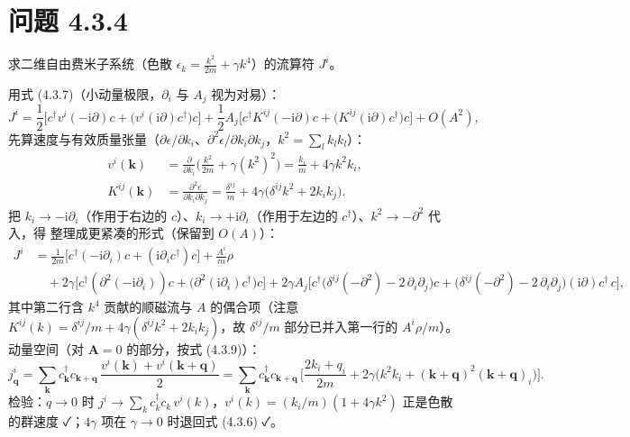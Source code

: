 \section*{问题 4.3.4}
\begin{problem}
求二维自由费米子系统（色散 $\epsilon_k=\frac{k^2}{2m}+\gamma k^4$）的流算符 $J^i$。
\end{problem}
\solution
用式 (4.3.7)（小动量极限，$\partial_i$ 与 $A_j$ 视为对易）：
\begin{equation*}
J^i=\frac{1}{2}\Big[c^\dagger v^i(-\mathrm{i}\partial)c+\big(v^i(\mathrm{i}\partial)c^\dagger\big)c\Big]
+\frac{1}{2}A_j\Big[c^\dagger K^{ij}(-\mathrm{i}\partial)c+\big(K^{ij}(\mathrm{i}\partial)c^\dagger\big)c\Big]+O(A^2),
\end{equation*}
先算速度与有效质量张量（$\partial\epsilon/\partial k_i$、$\partial^2\epsilon/\partial k_i\partial k_j$，$k^2=\sum_lk_lk_l$）：
\begin{align*}
v^i(\pmb k)&=\frac{\partial}{\partial k_i}\Big(\frac{k^2}{2m}+\gamma(k^2)^2\Big)=\frac{k_i}{m}+4\gamma k^2k_i,\\
K^{ij}(\pmb k)&=\frac{\partial^2\epsilon}{\partial k_i\partial k_j}
=\frac{\delta^{ij}}{m}+4\gamma\big(\delta^{ij}k^2+2k_ik_j\big).
\end{align*}
把 $k_i\to-\mathrm{i}\partial_i$（作用于右边的 $c$）、$k_i\to+\mathrm{i}\partial_i$（作用于左边的 $c^\dagger$）、$k^2\to-\partial^2$ 代入，得
整理成更紧凑的形式（保留到 $O(A)$）：
\begin{align*}
J^i&=\frac{1}{2m}\Big[c^\dagger(-\mathrm{i}\partial_i)c+(\mathrm{i}\partial_ic^\dagger)c\Big]+\frac{A^i}{m}\rho\\
&\quad+2\gamma\Big[c^\dagger(\partial^2(-\mathrm{i}\partial_i))c+\big(\partial^2(\mathrm{i}\partial_i)c^\dagger\big)c\Big]
+2\gamma A_j\Big[c^\dagger\big(\delta^{ij}(-\partial^2)-2\,\partial_i\partial_j\big)c+\big(\delta^{ij}(-\partial^2)-2\,\partial_i\partial_j\big)(\mathrm{i}\partial)c^\dagger\,c\Big],
\end{align*}
其中第二行含 $k^4$ 贡献的顺磁流与 $A$ 的偶合项（注意 $K^{ij}(k)=\delta^{ij}/m+4\gamma(\delta^{ij}k^2+2k_ik_j)$，故 $\delta^{ij}/m$ 部分已并入第一行的 $A^i\rho/m$）。动量空间（对 $\pmb A=0$ 的部分，按式 (4.3.9)）：
\begin{equation*}
j^i_{\pmb q}=\sum_{\pmb k}c^\dagger_{\pmb k}c_{\pmb k+\pmb q}\,
\frac{v^i(\pmb k)+v^i(\pmb k+\pmb q)}{2}
=\sum_{\pmb k}c^\dagger_{\pmb k}c_{\pmb k+\pmb q}\,
\Big[\frac{2k_i+q_i}{2m}+2\gamma\big(k^2k_i+(\pmb k+\pmb q)^2(\pmb k+\pmb q)_i\big)\Big].
\end{equation*}
检验：$q\to0$ 时 $j^i\to\sum_kc^\dagger_kc_k\,v^i(k)$，$v^i(k)=(k_i/m)(1+4\gamma k^2)$ 正是色散的群速度 ✓；$4\gamma$ 项在 $\gamma\to0$ 时退回式 (4.3.6) ✓。

